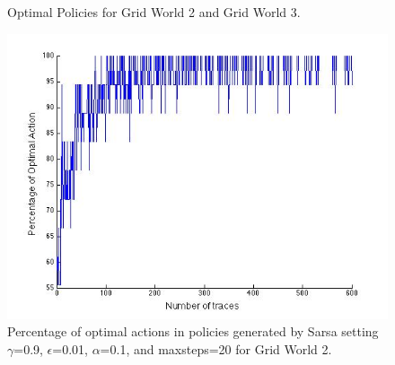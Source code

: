 \documentclass[10pt]{article}   	%
\begin{document}
\begin{figure}
\centering
{}
\caption{Optimal Policies for Grid World 2 and Grid World 3. \label{fig:gw2op}}
\end{figure}

\begin{figure}
\centering
\includegraphics[scale=0.6]{./figures/SarsaGridWorld2}
\caption{Percentage of optimal actions in policies generated by Sarsa setting $\gamma$=0.9, $\epsilon$=0.01, $\alpha$=0.1, and maxsteps=20 for Grid World 2. \label{fig:sarsaGrid2}}
\end{figure}
\end{document}
